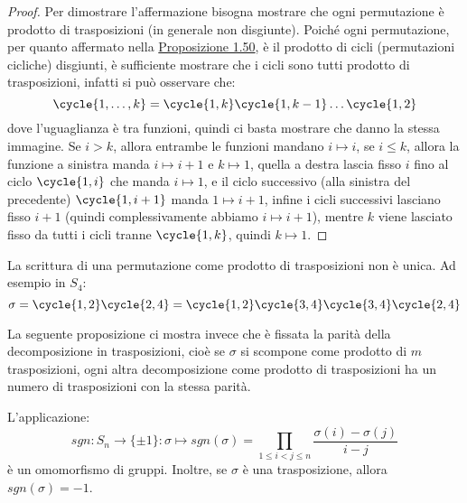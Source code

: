 \documentclass[11pt]{scrartcl}
\begin{document}
\begin{proof}
    Per dimostrare l'affermazione bisogna mostrare che ogni permutazione è prodotto di trasposizioni (in generale non disgiunte).
    Poiché ogni permutazione, per quanto affermato nella \hyperref[perm]{Proposizione 1.50}, è il prodotto di cicli (permutazioni cicliche) disgiunti,
    è sufficiente mostrare che i cicli sono tutti prodotto di trasposizioni, infatti si può osservare che:
        \[ \cycle{1,\ldots,k} = \cycle{1,k}\cycle{1,k-1}\ldots\cycle{1,2}
            \]
    dove l'uguaglianza è tra funzioni, quindi ci basta mostrare che danno la stessa immagine. Se $i>k$, allora entrambe le funzioni mandano $i \longmapsto i$, se 
    $i \leq k$, allora la funzione a sinistra manda $i \longmapsto i+1$ e $k \longmapsto 1$, quella a destra lascia fisso $i$ fino al ciclo $\cycle{1,i}$ che manda $i \longmapsto 1$,
    e il ciclo successivo (alla sinistra del precedente) $\cycle{1,i+1}$ manda $1 \longmapsto i+1$, infine i cicli successivi lasciano fisso $i+1$ (quindi complessivamente abbiamo $i \longmapsto i+1$), 
    mentre $k$ viene lasciato fisso da tutti i cicli tranne $\cycle{1,k}$, quindi $k \longmapsto 1$.
\end{proof}

\begin{remark}
    La scrittura di una permutazione come prodotto di trasposizioni non è unica. Ad esempio in $S_4$:
        \[ \sigma = \cycle{1,2}\cycle{2,4} = \cycle{1,2}\cycle{3,4}\cycle{3,4}\cycle{2,4}
            \]
\end{remark}

La seguente proposizione ci mostra invece che è fissata la parità della decomposizione in trasposizioni, cioè se $\sigma$ si scompone come prodotto di $m$ trasposizioni,
ogni altra decomposizione come prodotto di trasposizioni ha un numero di trasposizioni con la stessa parità.

\begin{proposition}
    L'applicazione:
        \[ sgn : S_n \longrightarrow \{\pm1\} : \sigma \longmapsto sgn(\sigma) = \prod_{1 \leq i < j \leq n} \frac{\sigma(i) - \sigma(j)}{i - j}
            \]
    è un omomorfismo di gruppi. Inoltre, se $\sigma$ è una trasposizione, allora $sgn(\sigma) = -1$.
\end{proposition}
\end{document}
